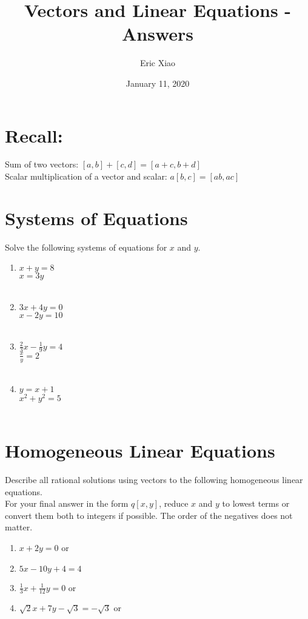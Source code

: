 \documentclass[11pt]{extarticle}
\title{\textbf{Vectors and Linear Equations - Answers}}
\author{Eric Xiao}
\date{January 11, 2020}
\begin{document}
\maketitle

\section{Recall:}
Sum of two vectors: $[a,b] + [c,d] = [a+c, b+d]$\\
Scalar multiplication of a vector and scalar: $a[b,c] = [ab, ac]$

\section{Systems of Equations}
Solve the following systems of equations for $x$ and $y$.
\begin{enumerate}
    \itemsep3.0em
    \item $x + y = 8$ \\ $x = 3y$ \\\\ 
    \item $3x + 4y = 0$ \\ $x - 2y = 10$ \\\\ 
    \item $\frac{2}{3}x - \frac{1}{9}y = 4$ \\ $\frac{x}{y} = 2$ \\\\ 
    \item $y = x + 1$ \\ $x^2 + y^2 = 5$ \\\\ 
\end{enumerate}

\section{Homogeneous Linear Equations}
Describe all rational solutions using vectors to the following homogeneous linear equations.\\
For your final answer in the form $q[x, y]$, reduce $x$ and $y$ to lowest terms or convert them both to integers if possible. The order of the negatives does not matter.
\begin{enumerate}
    \itemsep2.5em
    \item $x + 2y = 0$  or 
    \item $5x - 10y + 4 = 4$ 
    \item $\frac{1}{3}x + \frac{1}{12}y = 0$  or 
    \item $\sqrt{2}x + 7y - \sqrt{3} = -\sqrt{3}$  or 
\end{enumerate}
\end{document}
